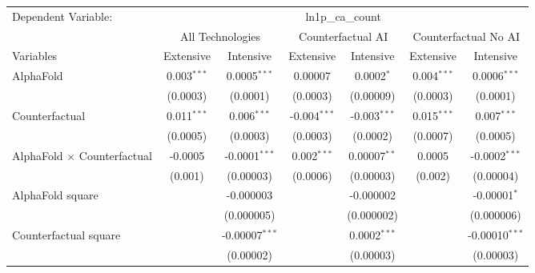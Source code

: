 \begingroup
\centering
\begin{tabular}{lcccccc}
   \tabularnewline \midrule \midrule
   Dependent Variable: & \multicolumn{6}{c}{ln1p\_ca\_count}\\
 & \multicolumn{2}{c}{All Technologies} & \multicolumn{2}{c}{Counterfactual AI} & \multicolumn{2}{c}{Counterfactual No AI} \\
\cmidrule(lr){1-1}\cmidrule(lr){2-3} \cmidrule(lr){4-5} \cmidrule(lr){6-7}
Variables & \multicolumn{1}{c}{Extensive} & \multicolumn{1}{c}{Intensive} & \multicolumn{1}{c}{Extensive} & \multicolumn{1}{c}{Intensive} & \multicolumn{1}{c}{Extensive} & \multicolumn{1}{c}{Intensive} \\
\cmidrule(lr){1-1}\cmidrule(lr){2-2} \cmidrule(lr){3-3} \cmidrule(lr){4-4} \cmidrule(lr){5-5} \cmidrule(lr){6-6} \cmidrule(lr){7-7}
   AlphaFold                          & 0.003$^{***}$ & 0.0005$^{***}$     & 0.00007        & 0.0002$^{*}$       & 0.004$^{***}$ & 0.0006$^{***}$\\   
                                      & (0.0003)      & (0.0001)           & (0.0003)       & (0.00009)          & (0.0003)      & (0.0001)\\   
   Counterfactual                     & 0.011$^{***}$ & 0.006$^{***}$      & -0.004$^{***}$ & -0.003$^{***}$     & 0.015$^{***}$ & 0.007$^{***}$\\   
                                      & (0.0005)      & (0.0003)           & (0.0003)       & (0.0002)           & (0.0007)      & (0.0005)\\   
   AlphaFold $\times$ Counterfactual  & -0.0005       & -0.0001$^{***}$    & 0.002$^{***}$  & 0.00007$^{**}$     & 0.0005        & -0.0002$^{***}$\\   
                                      & (0.001)       & (0.00003)          & (0.0006)       & (0.00003)          & (0.002)       & (0.00004)\\   
   AlphaFold square                   &               & -0.000003          &                & -0.000002          &               & -0.00001$^{*}$\\   
                                      &               & (0.000005)         &                & (0.000002)         &               & (0.000006)\\   
   Counterfactual square              &               & -0.00007$^{***}$   &                & 0.0002$^{***}$     &               & -0.00010$^{***}$\\   
                                      &               & (0.00002)          &                & (0.00003)          &               & (0.00003)\\   

\end{tabular}

